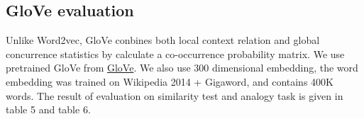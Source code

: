 \documentclass[a4paper, 11pt]{article}
\begin{document}
\subsection{GloVe evaluation}
Unlike Word2vec, GloVe conbines both local context relation and global concurrence statistics by calculate a co-occurrence probability matrix. We use pretrained GloVe from \href{https://nlp.stanford.edu/projects/glove/}{GloVe}. We also use 300 dimensional embedding, the word embedding was trained on Wikipedia 2014 + Gigaword, and contains 400K words. The result of evaluation on similarity test and analogy task is given in table 5 and table 6.
\begin{table}[ht!]
\centering
{}
\caption{Similarity result of GloVe}
\label{tab:my-table}
\end{table}
\begin{table}[ht!]
\centering
{}
\caption{Analogy tasks on GloVe }
\label{tab:my-table}
\end{table}
\end{document}
